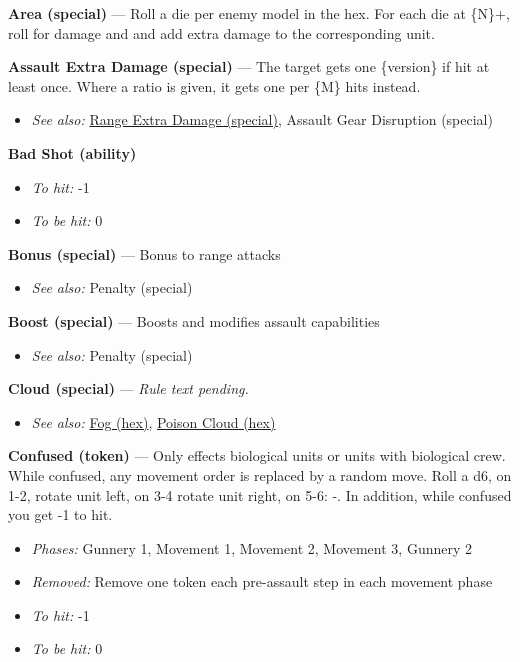 \documentclass[a4paper,12pt]{article}
\begin{document}
\label{rule-special-area}%
\noindent\textbf{Area (special)} --- Roll a die per enemy model in the hex. For each die at \{N\}+, roll for damage and and add extra damage to the corresponding unit.


\label{rule-special-assault-extra-damage}%
\noindent\textbf{Assault Extra Damage (special)} --- The target gets one \{version\} if hit at least once. Where a ratio is given, it gets one per \{M\} hits instead.
\begin{itemize}
\item \textit{See also:} \hyperref[rule-special-range-extra-damage]{Range Extra Damage (special)}, Assault Gear Disruption (special)
\end{itemize}


\label{rule-ability-bad-shot}%
\noindent\textbf{Bad Shot (ability)}\begin{itemize}
\item \textit{To hit:} -1
\item \textit{To be hit:} 0
\end{itemize}


\label{rule-special-bonus}%
\noindent\textbf{Bonus (special)} --- Bonus to range attacks
\begin{itemize}
\item \textit{See also:} Penalty (special)
\end{itemize}


\label{rule-special-boost}%
\noindent\textbf{Boost (special)} --- Boosts and modifies assault capabilities
\begin{itemize}
\item \textit{See also:} Penalty (special)
\end{itemize}


\label{rule-special-cloud}%
\noindent\textbf{Cloud (special)} --- \textit{Rule text pending.}\begin{itemize}
\item \textit{See also:} \hyperref[rule-hex-fog]{Fog (hex)}, \hyperref[rule-hex-poison-cloud]{Poison Cloud (hex)}
\end{itemize}


\label{rule-token-confused}%
\noindent\textbf{Confused (token)} --- Only effects biological units or units with biological crew. While confused, any movement order is replaced by a random move. Roll a d6, on 1-2, rotate unit left, on 3-4 rotate unit right, on 5-6: -. In addition, while confused you get -1 to hit.
\begin{itemize}
\item \textit{Phases:} Gunnery 1, Movement 1, Movement 2, Movement 3, Gunnery 2
\item \textit{Removed:} Remove one token each pre-assault step in each movement phase
\item \textit{To hit:} -1
\item \textit{To be hit:} 0
\end{itemize}
\end{document}
